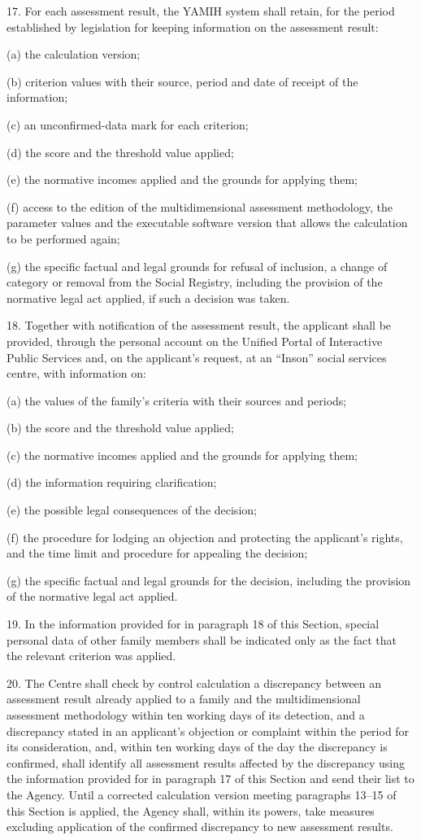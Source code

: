 \documentclass[14pt,a4paper]{extarticle}
\newcommand{\norm}[1]{\par\noindent\hspace*{1.27cm}#1. }
\newcommand{\sub}[1]{\par\noindent\hspace*{1.27cm}#1 }
\begin{document}
\norm{17}For each assessment result, the YAMIH system shall retain, for the period established by legislation for keeping information on the assessment result:
\sub{(a)}the calculation version;
\sub{(b)}criterion values with their source, period and date of receipt of the information;
\sub{(c)}an unconfirmed-data mark for each criterion;
\sub{(d)}the score and the threshold value applied;
\sub{(e)}the normative incomes applied and the grounds for applying them;
\sub{(f)}access to the edition of the multidimensional assessment methodology, the parameter values and the executable software version that allows the calculation to be performed again;
\sub{(g)}the specific factual and legal grounds for refusal of inclusion, a change of category or removal from the Social Registry, including the provision of the normative legal act applied, if such a decision was taken.

\norm{18}Together with notification of the assessment result, the applicant shall be provided, through the personal account on the Unified Portal of Interactive Public Services and, on the applicant’s request, at an “Inson” social services centre, with information on:
\sub{(a)}the values of the family’s criteria with their sources and periods;
\sub{(b)}the score and the threshold value applied;
\sub{(c)}the normative incomes applied and the grounds for applying them;
\sub{(d)}the information requiring clarification;
\sub{(e)}the possible legal consequences of the decision;
\sub{(f)}the procedure for lodging an objection and protecting the applicant’s rights, and the time limit and procedure for appealing the decision;
\sub{(g)}the specific factual and legal grounds for the decision, including the provision of the normative legal act applied.

\norm{19}In the information provided for in paragraph 18 of this Section, special personal data of other family members shall be indicated only as the fact that the relevant criterion was applied.

\norm{20}The Centre shall check by control calculation a discrepancy between an assessment result already applied to a family and the multidimensional assessment methodology within ten working days of its detection, and a discrepancy stated in an applicant’s objection or complaint within the period for its consideration, and, within ten working days of the day the discrepancy is confirmed, shall identify all assessment results affected by the discrepancy using the information provided for in paragraph 17 of this Section and send their list to the Agency. Until a corrected calculation version meeting paragraphs 13–15 of this Section is applied, the Agency shall, within its powers, take measures excluding application of the confirmed discrepancy to new assessment results.
\end{document}

